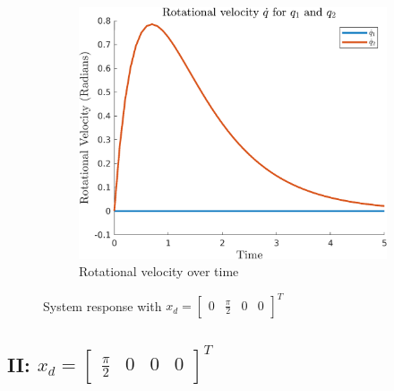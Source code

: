 \documentclass{article}
\begin{document}
\begin{figure}[H]
    \begin{subfigure}{0.325\textwidth}
        \centering
        \includegraphics[width = \textwidth]{figures/rotational-velocity-c1.png}
        \caption{Rotational velocity over time}
    \end{subfigure}
    \caption{System response with $x_d=\begin{bmatrix} 0 & \frac{\pi}{2} & 0 & 0 \end{bmatrix}^T$}
    \label{fig:c-1_results}
\end{figure}


\subsection*{II: $x_d = \begin{bmatrix} \frac{\pi}{2} & 0 & 0 & 0 \end{bmatrix}^T$}
\end{document}
